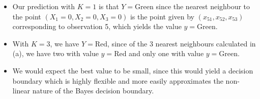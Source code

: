 \begin{itemize}
        \begin{equation*}
            \begin{split}
                &d\bigl((X_1 = 0, X_2 = 0, X_3 = 0), (x_{41}, x_{42}, x_{43})\bigr) \\
                = \, &\sqrt{1^2 + 2^2} \\
                = \, &\sqrt{5} \\
                \approx \, &2.236068,
            \end{split}
        \end{equation*}
        \begin{equation*}
            \begin{split}
                &d\bigl((X_1 = 0, X_2 = 0, X_3 = 0), (x_{51}, x_{52}, x_{53})\bigr) \\
                = \, &\sqrt{(-1)^2 + 1^2} \\
                = \, &\sqrt{2} \\
                \approx \, &1.414214,
            \end{split}
        \end{equation*}
        and
        \begin{equation*}
            \begin{split}
                &d\bigl((X_1 = 0, X_2 = 0, X_3 = 0), (x_{61}, x_{62}, x_{63})\bigr) \\
                = \, &\sqrt{1^2 + 1^2 + 1^2} \\
                = \, &\sqrt{3} \\
                \approx \, &1.732051.
            \end{split}
        \end{equation*}
    \item[(b)] Our prediction with $K = 1$ is that $Y = \text{Green}$ since the
        nearest neighbour to the point $(X_1 = 0, X_2 = 0, X_3 = 0)$ is the point
        given by $(x_{51}, x_{52}, x_{53})$ corresponding to observation
        5, which yields
        the value $y = \text{Green}$.
    \item[(c)] With $K = 3$, we have $Y = \text{Red}$, since of the 3 nearest
        neighbours calculated in (a), we have two with value $y =
        \text{Red}$ and only
        one with value $y = \text{Green}$.
    \item[(d)] We would expect the best value to be small, since this would yield
        a decision boundary which is highly flexible and more easily
        approximates the
        non-linear nature of the Bayes decision boundary.
\end{itemize}
